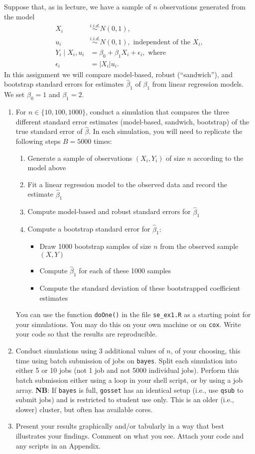 \documentclass{article}
\newcommand{\abs}[1]{\left\lvert#1\right\rvert}
\begin{document}
Suppose that, as in lecture, we have a sample of $n$ observations generated from the model
\begin{align*}
X_i &\stackrel{i.i.d.}{\sim} N(0, 1), \\
u_i &\stackrel{i.i.d.}{\sim} N(0, 1), \text{ independent of the } X_i, \\
Y_i \mid X_i, u_i &= \beta_0 + \beta_1 X_i + \epsilon_i, \text{ where} \\
\epsilon_i &= \abs{X_i}u_i.
\end{align*}
In this assignment we will compare model-based, robust (``sandwich''), and bootstrap standard errors for estimates $\hat{\beta}_1$ of $\beta_1$ from linear regression models. We set $\beta_0 = 1$ and $\beta_1 = 2$.
\begin{enumerate}
\item For $n \in \{10, 100, 1000\}$, conduct a simulation that compares the three different standard error estimates (model-based, sandwich, bootstrap) of the true standard error of $\hat{\beta}$. In each simulation, you will need to replicate the following steps $B = 5000$ times:
\begin{enumerate}
\item Generate a sample of observations $(X_i, Y_i)$ of size $n$ according to the model above
\item Fit a linear regression model to the observed data and record the estimate $\hat{\beta}_1$
\item Compute model-based and robust standard errors for $\hat{\beta}_1$
\item Compute a bootstrap standard error for $\hat{\beta}_1:$ 
\begin{itemize}
\item Draw 1000 bootstrap samples of size $n$ from the observed sample $(X, Y)$
\item Compute $\hat{\beta}_1$ for each of these 1000 samples
\item Compute the standard deviation of these bootstrapped coefficient estimates
\end{itemize}
\end{enumerate}
You can use the function \texttt{doOne()} in the file \texttt{se\_ex1.R} as a starting point for your simulations. You may do this on your own machine or on \texttt{cox}. Write your code so that the results are reproducible.

\item Conduct simulations using 3 additional values of $n$, of your choosing, this time using batch submission of jobs on \texttt{bayes}. Split each simulation into either 5 or 10 jobs (not 1 job and not 5000 individual jobs). Perform this batch submission either using a loop in your shell script, or by using a job array. \textbf{NB}: If \texttt{bayes} is full, \texttt{gosset} has an identical setup (i.e., use \texttt{qsub} to submit jobs) and is restricted to student use only. This is an older (i.e., slower) cluster, but often has available cores.

\item Present your results graphically and/or tabularly in a way that best illustrates your findings. Comment on what you see. Attach your code and any scripts in an Appendix.
\end{enumerate}
\end{document}
